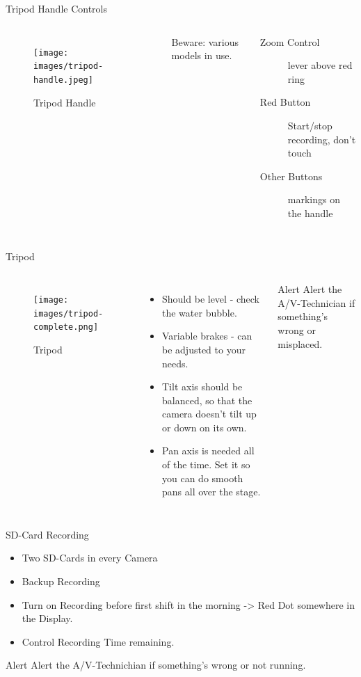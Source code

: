 \documentclass[aspectratio=169]{beamer}
\begin{document}
\begin{frame}{Tripod Handle Controls}
	\begin{columns}[T,onlytextwidth]
	\begin{figure} 
		\centering
		\texttt{[image: images/tripod-handle.jpeg]}
		\caption{Tripod Handle}
	\end{figure}

	Beware: various models in use.
	\begin{description}
		\item[Zoom Control] lever above red ring
		\item[Red Button] Start/stop recording, don't touch
		\item[Other Buttons] markings on the handle
    \end{description}
	\end{columns}
\end{frame}

\begin{frame}{Tripod}
	\begin{columns}[T,onlytextwidth]
	\begin{figure} 
		\centering
		\texttt{[image: images/tripod-complete.png]}
		\caption{Tripod}
	\end{figure}
	
	\begin{itemize}
			\item Should be level - check the water bubble.
			\item Variable brakes - can be adjusted to your needs.
			\item Tilt axis should be balanced, so that the camera doesn't tilt up or down on its own.
			\item Pan axis is needed all of the time. Set it so you can do smooth pans all over the stage.
		\end{itemize}
		\begin{alertblock}{Alert}
			Alert the A/V-Technician if something's wrong or misplaced.
		\end{alertblock}
	\end{columns}
\end{frame}

\begin{frame}{SD-Card Recording}
		\begin{itemize}
			\item Two SD-Cards in every Camera
			\item Backup Recording
			\item Turn on Recording before first shift in the morning -> Red Dot somewhere in the Display.
			\item Control Recording Time remaining. 
		\end{itemize}
		\begin{alertblock}{Alert}
			Alert the A/V-Technichian if something's wrong or not running.
		\end{alertblock}
\end{frame}
\end{document}
